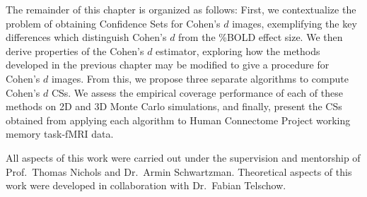 The remainder of this chapter is organized as follows: First, we contextualize the problem of obtaining Confidence Sets for Cohen's $d$ images, exemplifying the key differences which distinguish Cohen's $d$ from the \%BOLD effect size. We then derive properties of the Cohen's $d$ estimator, exploring how the methods developed in the previous chapter may be modified to give a procedure for Cohen's $d$ images. From this, we propose three separate algorithms to compute Cohen's $d$ CSs. We assess the empirical coverage performance of each of these methods on 2D and 3D Monte Carlo simulations, and finally, present the CSs obtained from applying each algorithm to Human Connectome Project working memory task-fMRI data. 

All aspects of this work were carried out under the supervision and mentorship of Prof.\ Thomas Nichols and Dr.\ Armin Schwartzman. Theoretical aspects of this work were developed in collaboration with Dr.\ Fabian Telschow.

